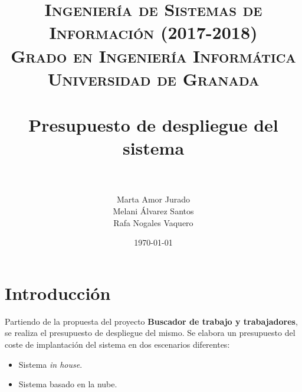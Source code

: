 


\title{	
\normalfont \normalsize 
\textsc{\textbf{Ingeniería de Sistemas de Información (2017-2018)} \\ Grado en Ingeniería Informática \\ Universidad de Granada} \\ [25pt] %
\horrule{0.5pt} \\[0.4cm] %
\huge Presupuesto de despliegue del sistema \\ %
\horrule{2pt} \\[0.5cm]
}

\author{Marta Amor Jurado \\ Melani Álvarez Santos \\ Rafa Nogales Vaquero} %

\date{\normalsize\today} %



\maketitle
\newpage 
\tableofcontents
\newpage
\setlength{\parindent}{1cm}


\section{Introducción}
Partiendo de la propuesta del proyecto \textbf{Buscador de trabajo y trabajadores}, se realiza el presupuesto de despliegue del mismo.
Se elabora un presupuesto del coste de implantación del sistema en dos escenarios diferentes:
\begin{itemize}
	\item Sistema \textit{in house}.
	\item Sistema basado en la nube.
\end{itemize}


